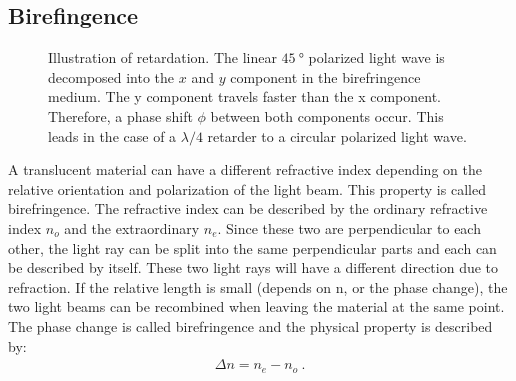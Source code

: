 \subsection{Birefingence}
%
\begin{figure}[!t]
\centering
\setlength{\tikzwidth}{\textwidth}
\caption{Illustration of retardation. The linear $\SI{45}{\degree}$ polarized light wave is decomposed into the $x$ and $y$ component in the birefringence medium. The y component travels faster than the x component. Therefore, a phase shift $\phi$ between both components occur. This leads in the case of a $\lambda/4$ retarder to a circular polarized light wave.}
\label{fig:optic_retardation}
\end{figure}
%
A translucent material can have a different refractive index depending on the relative orientation and polarization of the light beam.
This property is called birefringence.
The refractive index can be described by the ordinary refractive index $n_o$ and the extraordinary $n_e$.
Since these two are perpendicular to each other, the light ray can be split into the same perpendicular parts and each can be described by itself.
These two light rays will have a different direction due to refraction.
If the relative length is small (depends on n, or the phase change), the two light beams can be recombined when leaving the material at the same point.
The phase change is called birefringence and the physical property is described by:
%
\begin{align}
    \Delta n = n_e - n_o \> .
\end{align}
%
%
%
